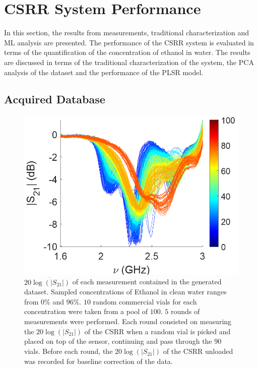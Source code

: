 \documentclass[journal,twoside,web]{ieeecolor}
\begin{document}
\section{CSRR System Performance}
\label{sec:csrrPerformance}
In this section, the results from measurements, traditional characterization and ML analysis are presented. The performance of the CSRR system is evaluated in terms of the quantification of the concentration of ethanol in water. The results are discussed in terms of the traditional characterization of the system, the PCA analysis of the dataset and the performance of the PLSR model.

\subsection{Acquired Database}
\label{ssec:mlMeasurement}
\begin{figure}[!t]
	\centering
	\includegraphics [trim = 0mm 0mm 0mm 0mm, clip, width=1\columnwidth]{figures/fig4_3.png}
	\caption{$20\dot{\log\left(|S_{21}|\right)}$ of each measurement contained in the generated dataset. Sampled concentrations of Ethanol in clean water ranges from $0\%$ and $96\%$. $10$ random commercial vials for each concentration were taken from a pool of $100$. $5$ rounds of measurements were performed. Each round consisted on measuring the $20\dot{\log\left(|S_{21}|\right)}$ of the CSRR when a random vial is picked and placed on top of the sensor, continuing and pass through the $90$ vials. Before each round, the $20\dot{\log\left(|S_{21}|\right)}$ of the CSRR unloaded was recorded for baseline correction of the data.}
	\label{fig:mlMeasTaken}
	\vspace{-0.3cm}
\end{figure}
\end{document}
